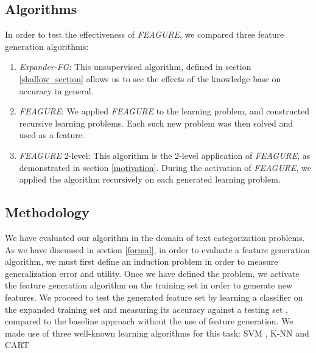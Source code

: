 \documentclass{article}
\theoremstyle{definition}
\begin{document}
\subsection{Algorithms}

In order to test the effectiveness of \emph{FEAGURE}, we compared three feature generation algorithms:
\begin{enumerate}
	\item \emph{Expander-FG}: This unsupervised algorithm, defined in section \ref{shallow_section} allows us to see the effects of the knowledge base on accuracy in general. %
	\item \emph{FEAGURE}: We applied \emph{FEAGURE} to the learning problem, and constructed recursive learning problems. Each such new problem was then solved and used as a feature.
	\item \emph{FEAGURE} 2-level: This algorithm is the 2-level application of \emph{FEAGURE}, as demonstrated in section \ref{motivation}. During the activation of \emph{FEAGURE}, we applied the algorithm recursively on each generated learning problem.%
\end{enumerate}

\subsection{Methodology}

We have evaluated our algorithm in the domain of text categorization problems.
As we have discussed in section \ref{formal}, in order to evaluate a feature generation algorithm, we must first define an induction problem in order to measure generalization error and utility. Once we have defined the problem, we activate the feature generation algorithm on the training set in order to generate new features. We proceed to test the generated feature set by learning a classifier on the expanded training set and measuring its accuracy against a testing set %
, compared to the baseline approach without the use of feature generation. We made use of three well-known learning algorithms for this task: SVM \citep{cortes1995support}, K-NN \citep{fix1951discriminatory} and CART \citep{breiman1984classification}%
\end{document}
